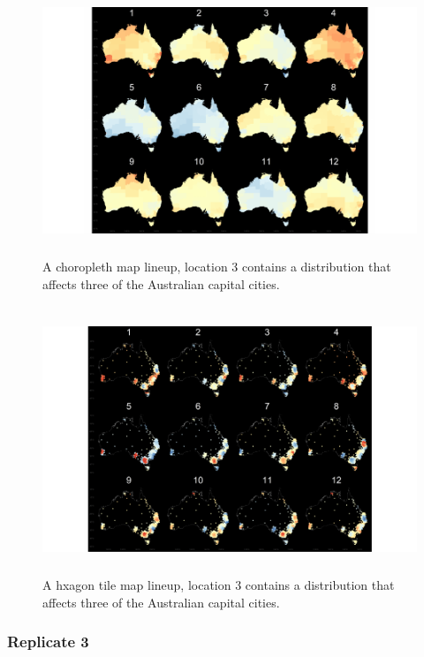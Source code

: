 \documentclass{monashthesis}
\begin{document}
\begin{figure}[H]
\centering
\includegraphics[height=8cm]{lineups/three-geo5-1.pdf}
\caption{\label{fig:three-geo5}A choropleth map lineup, location 3 contains a distribution that affects three of the Australian capital cities.}
\end{figure}

\begin{figure}[H]
\centering
\includegraphics[height=8cm]{lineups/three-hex5-1.pdf}
\caption{\label{fig:three-hex5}A hxagon tile map lineup, location 3 contains a distribution that affects three of the Australian capital cities.}
\end{figure}

\hypertarget{replicate-3-1}{%
\subsubsection{Replicate 3}\label{replicate-3-1}}
\end{document}

